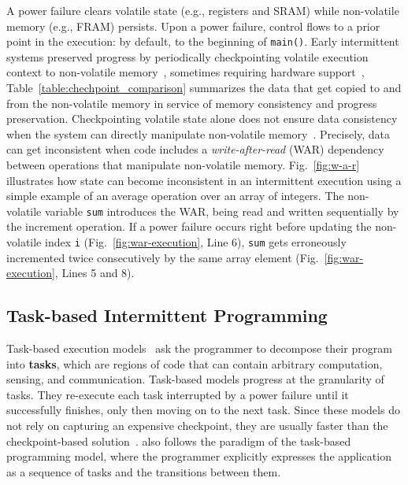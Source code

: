 A power failure clears volatile state (e.g., registers and SRAM) while non-volatile memory (e.g., FRAM) persists. Upon a power failure, control flows to a prior point in the execution: by default, to the beginning of {\tt main()}. Early intermittent systems preserved progress by periodically checkpointing volatile execution context to non-volatile memory~\cite{mementos}, sometimes requiring hardware support~\cite{mottola2017harvos,hibernusplusplus,hibernus,idetic,quickrecall}, Table~\ref{table:chechpoint_comparison} summarizes the data that get copied to and from the non-volatile memory in service of memory consistency and progress preservation. Checkpointing volatile state alone does not ensure data consistency when the system can directly manipulate non-volatile memory~\cite{mspcdino}. Precisely, data can get inconsistent when code includes a \emph{write-after-read} (WAR) dependency between operations that manipulate non-volatile memory. Fig.~\ref{fig:w-a-r} illustrates how state can become inconsistent in an intermittent execution using a simple example of an average operation over an array of integers.
The non-volatile variable \texttt{sum} introduces the WAR, being read and written sequentially by the increment operation. If a power failure occurs right before updating the non-volatile index \texttt{i} (Fig.~\ref{fig:war-execution}, Line 6), \texttt{sum} gets erroneously incremented twice consecutively by the same array element (Fig.~\ref{fig:war-execution}, Lines 5 and 8).

\subsection{Task-based Intermittent Programming}
\label{section:background_task_computing}

Task-based execution models~\cite{dino,chain,alpaca} ask the programmer to decompose their program into \textbf{tasks}, which are regions of code that can contain arbitrary computation, sensing, and communication. Task-based models progress at the granularity of tasks. They re-execute each task interrupted by a power failure until it successfully finishes, only then moving on to the next task. Since these models do not rely on capturing an expensive checkpoint, they are usually faster than the checkpoint-based solution~\cite{chain, alpaca}.  \sys also follows the paradigm of the task-based programming model, where the programmer explicitly expresses the application as a sequence of tasks and the transitions between them.

